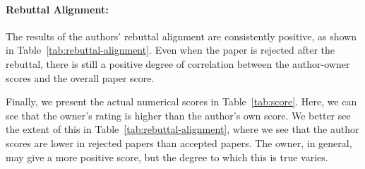 \documentclass{article} %
\begin{document}
\paragraph{Rebuttal Alignment:}
The results of the authors' rebuttal alignment are consistently positive, as shown in Table~\ref{tab:rebuttal-alignment}. Even when the paper is rejected after the rebuttal, there is still a positive degree of correlation between the author-owner scores and the overall paper score. 

Finally, we present the actual numerical scores in Table~\ref{tab:score}. Here, we can see that the owner's rating is higher than the author's own score. We better see the extent of this in Table~\ref{tab:rebuttal-alignment}, where we see that the author scores are lower in rejected papers than accepted papers. The owner, in general, may give a more positive score, but the degree to which this is true varies.
\begin{table}[t]
\centering
\caption{Rebuttal Alignment}
\label{tab:rebuttal-alignment} %
\end{table}


\begin{table}[t]
\centering
\caption{Rebuttal Alignment Correlations}
\label{tab:rebuttal-correlation}    

\label{tab:rebuttal-correaltion}
\end{table}
\end{document}
